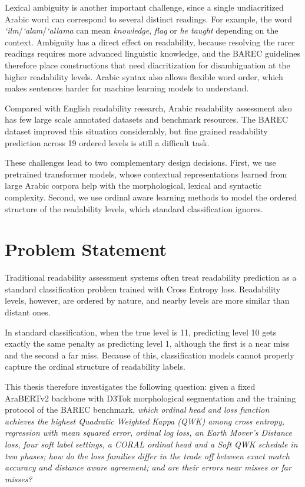 \documentclass[12pt]{report}
\begin{document}
Lexical ambiguity is another important challenge, since a single undiacritized Arabic word can correspond to several distinct readings. For example, the word \textit{`ilm}/\textit{`alam}/\textit{`allama} can mean \emph{knowledge}, \emph{flag} or \emph{he taught} depending on the context. Ambiguity has a direct effect on readability, because resolving the rarer readings requires more advanced linguistic knowledge, and the BAREC guidelines therefore place constructions that need diacritization for disambiguation at the higher readability levels. Arabic syntax also allows flexible word order, which makes sentences harder for machine learning models to understand.

Compared with English readability research, Arabic readability assessment also has few large scale annotated datasets and benchmark resources. The BAREC dataset improved this situation considerably, but fine grained readability prediction across 19 ordered levels is still a difficult task.

These challenges lead to two complementary design decisions. First, we use pretrained transformer models, whose contextual representations learned from large Arabic corpora help with the morphological, lexical and syntactic complexity. Second, we use ordinal aware learning methods to model the ordered structure of the readability levels, which standard classification ignores.
\section{Problem Statement}
Traditional readability assessment systems often treat readability prediction as a standard classification problem trained with Cross Entropy loss. Readability levels, however, are ordered by nature, and nearby levels are more similar than distant ones.

In standard classification, when the true level is 11, predicting level 10 gets exactly the same penalty as predicting level 1, although the first is a near miss and the second a far miss. Because of this, classification models cannot properly capture the ordinal structure of readability labels.

This thesis therefore investigates the following question: given a fixed AraBERTv2 backbone with D3Tok morphological segmentation and the training protocol of the BAREC benchmark, \emph{which ordinal head and loss function achieves the highest Quadratic Weighted Kappa (QWK) among cross entropy, regression with mean squared error, ordinal log loss, an Earth Mover's Distance loss, four soft label settings, a CORAL ordinal head and a Soft QWK schedule in two phases; how do the loss families differ in the trade off between exact match accuracy and distance aware agreement; and are their errors near misses or far misses?}
\end{document}
